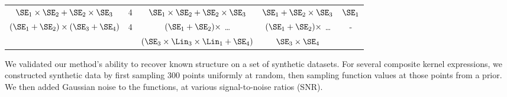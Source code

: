 \begin{table*}[ht!]
\begin{center}
{\begin{tabular}{c c | c c c}
                                              \\
$\SE_1 \times \SE_2 + \SE_2 \times \SE_3$ & 4 
                                              & $\SE_1 \times \SE_2 + \SE_2 \times \SE_3$
                                              & $\SE_1 + \SE_2 \times \SE_3$
                                              & $\SE_1$
                                              \\
\multirow{2}{*}{ $(\SE_1 + \SE_2) \times (\SE_3 + \SE_4)$ } & \multirow{2}{*}{4}
                                              & $(\SE_1 + \SE_2) \times$ \dots
                                              & $(\SE_1 + \SE_2) \times$ \dots 
                                              & \multirow{2}{*}{-}
                                              \\
                                          &    & $(\SE_3\times\Lin_3\times\Lin_1 + \SE_4)$ & $\SE_3 \times \SE_4$ &
\end{tabular}
}
\end{center}
\end{table*}

%

We validated our method's ability to recover known structure on a set of synthetic datasets.
For several composite kernel expressions, we constructed synthetic data by first sampling 300 points uniformly at random, then sampling function values at those points from a \gp{} prior.
We then added \iid Gaussian noise to the functions, at various signal-to-noise ratios (SNR).

%
%


